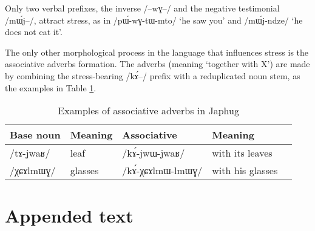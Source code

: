 \documentclass[oldfontcommands,oneside,a4paper,11pt]{article}
\newcommand{\ipa}[1]{/#1/} %
\begin{document}
Only two verbal prefixes, the inverse \ipa{--wɣ--} and the negative testimonial \ipa{mɯ́j--}, attract stress, as in \ipa{pɯ́-wɣ-tɯ-mto} `he saw you' and \ipa{mɯ́j-ndze} `he does not eat it'.
         
The only other morphological process in the language that influences stress is the  associative adverbs formation. The adverbs (meaning `together with X') are made by combining the stress-bearing \ipa{kɤ́--}  prefix with a reduplicated noun stem, as the examples in Table \ref{tab:assoc.adv}.

\begin{table}
 \caption{Examples of associative adverbs in Japhug} \label{tab:assoc.adv}  \centering
\begin{tabular}{lllll}
\toprule
Base noun & Meaning & Associative & Meaning \\
\midrule
\ipa{tɤ-jwaʁ} & leaf & \ipa{kɤ́-jwɯ-jwaʁ} & with its leaves\\
\ipa{χɕɤlmɯɣ} & glasses & \ipa{kɤ́-χɕɤlmɯ-lmɯɣ} & with his glasses\\
\bottomrule
\end{tabular}
\end{table}
         
         
     \section{Appended text}


\end{document}
